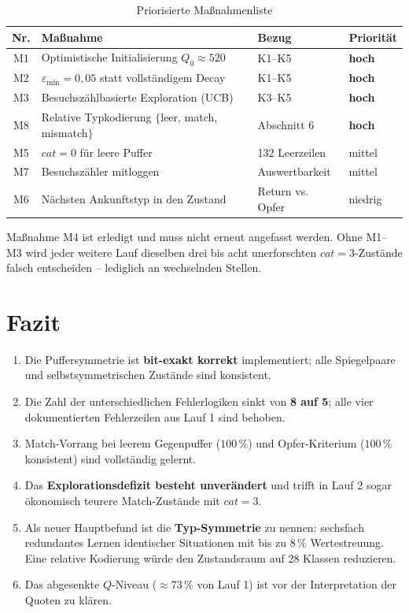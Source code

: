 \documentclass[11pt,a4paper]{article}
\begin{document}
\begin{table}[htbp]
\centering
\caption{Priorisierte Maßnahmenliste}
\label{tab:massnahmen3}
\begin{tabularx}{\textwidth}{@{}clLl@{}}
\toprule
\textbf{Nr.} & \textbf{Maßnahme} & \textbf{Bezug} & \textbf{Priorität} \\
\midrule
M1 & Optimistische Initialisierung $Q_0 \approx 520$ & K1--K5 & \textbf{hoch} \\
M2 & $\varepsilon_{\min} = 0{,}05$ statt vollständigem Decay & K1--K5 & \textbf{hoch} \\
M3 & Besuchszählbasierte Exploration (UCB) & K3--K5 & \textbf{hoch} \\
M8 & Relative Typkodierung $\{$leer, match, mismatch$\}$ & Abschnitt 6 & \textbf{hoch} \\
M5 & $cat=0$ für leere Puffer & 132 Leerzeilen & mittel \\
M7 & Besuchszähler mitloggen & Auswertbarkeit & mittel \\
M6 & Nächsten Ankunftstyp in den Zustand & Return vs. Opfer & niedrig \\
\bottomrule
\end{tabularx}
\end{table}

\noindent
Maßnahme M4 ist erledigt und muss nicht erneut angefasst werden. Ohne
M1--M3 wird jeder weitere Lauf dieselben drei bis acht unerforschten
$cat=3$-Zustände falsch entscheiden -- lediglich an wechselnden Stellen.

\section{Fazit}

\begin{enumerate}[leftmargin=1.6em]
  \item Die Puffersymmetrie ist \textbf{bit-exakt korrekt} implementiert;
        alle Spiegelpaare und selbstsymmetrischen Zustände sind konsistent.
  \item Die Zahl der unterschiedlichen Fehlerlogiken sinkt von
        \textbf{8 auf 5}; alle vier dokumentierten Fehlerzeilen aus Lauf 1
        sind behoben.
  \item Match-Vorrang bei leerem Gegenpuffer ($100\,\%$) und
        Opfer-Kriterium ($100\,\%$ konsistent) sind vollständig gelernt.
  \item Das \textbf{Explorationsdefizit besteht unverändert} und trifft in
        Lauf 2 sogar ökonomisch teurere Match-Zustände mit $cat=3$.
  \item Als neuer Hauptbefund ist die \textbf{Typ-Symmetrie} zu nennen:
        sechsfach redundantes Lernen identischer Situationen mit bis zu
        $8\,\%$ Wertestreuung. Eine relative Kodierung würde den
        Zustandsraum auf 28 Klassen reduzieren.
  \item Das abgesenkte $Q$-Niveau ($\approx 73\,\%$ von Lauf 1) ist vor der
        Interpretation der Quoten zu klären.
\end{enumerate}
\end{document}
